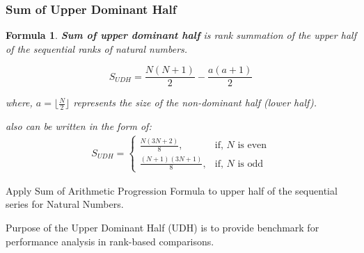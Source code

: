 \documentclass[a4paper,fleqn,review]{cas-sc}
\newtheorem{theorem}{Formula}
\begin{document}
\subsubsection{Sum of Upper Dominant Half}
\begin{theorem} \label{thm:sum-upper-dominant-half}
	\textbf{Sum of upper dominant half} is rank summation of the upper half of the sequential ranks of natural numbers.
		
	\begin{equation}
		S_{UDH} = \frac{N(N + 1)}{2} - \frac{a(a+1)}{2}
		\label{eq:SUDH}
	\end{equation}
	
	where,
	 \( a = \lfloor \frac{N}{2} \rfloor \) represents the size of the non-dominant half (lower half).
	 
	also can be written in the form of:
	\begin{align*}
	 S_{UDH} =
	 \begin{cases}
	 	\frac{N(3N + 2)}{8},
	 	& \text{if, } N \text{ is even} \\
	 	\frac{(N + 1)(3N + 1)}{8}, & \text{if, } N \text{ is odd}
	 \end{cases}
	\end{align*}
\end{theorem}

\begin{pot}[\ref{thm:sum-upper-dominant-half}]
	Apply Sum of Arithmetic Progression Formula to upper half of the sequential series for Natural Numbers.
\end{pot}
 
Purpose of the Upper Dominant Half (UDH) is to provide benchmark for performance analysis in rank-based comparisons.
\end{document}
